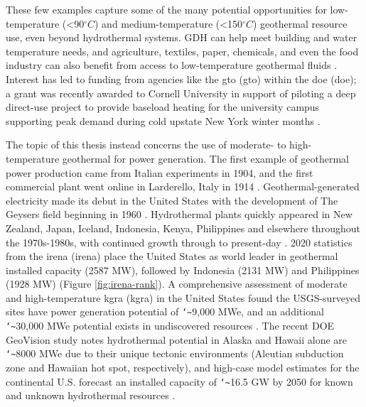 These few examples capture some of the many potential opportunities for low-temperature (<90\(^\circ C\)) and medium-temperature (<150\(^\circ C\)) geothermal resource use, even beyond hydrothermal systems. GDH can help meet building and water temperature needs, and agriculture, textiles, paper, chemicals, and even the food industry can also benefit from access to low-temperature geothermal fluids \citep{doe_low_2021,liu_overview_2015}. Interest has led to funding from agencies like the \acrlong{gto} (\acrshort{gto}) within the \acrlong{doe} (\acrshort{doe}); a grant was recently awarded to Cornell University in support of piloting a deep direct-use project to provide baseload heating for the university campus supporting peak demand during cold upstate New York winter months  \citep{hamm_geothermal_2021,tester_integrating_2015}.

The topic of this thesis instead concerns the use of moderate- to high-temperature geothermal for power generation. The first example of geothermal power production came from Italian experiments in 1904, and the first commercial plant went online in Larderello, Italy in 1914 \citep[~p. 251]{dipippo_geothermal_2012}. Geothermal-generated electricity made its debut in the United States with the development of The Geysers field beginning in 1960 \citep{tester_future_2006}. Hydrothermal plants quickly appeared in New Zealand, Japan, Iceland, Indonesia, Kenya, Philippines and elsewhere throughout the 1970s-1980s, with continued growth through to present-day \citep{lund_characteristics_2007}. 2020 statistics from the \acrlong{irena} (\acrshort{irena}) place the United States as world leader in geothermal installed capacity (2587 MW), followed by Indonesia (2131 MW) and Philippines (1928 MW) \citep{irena_country_2021} (Figure \ref{fig:irena-rank}). A comprehensive assessment of moderate and high-temperature \acrlong{kgra} (\acrshort{kgra}) in the United States found the USGS-surveyed sites have power generation potential of \texttt{\char`\~}9,000 MWe, and an additional \texttt{\char`\~}30,000 MWe potential exists in undiscovered resources \citep{williams_assessment_2008}. The recent DOE GeoVision study notes hydrothermal potential in Alaska and Hawaii alone are \texttt{\char`\~}8000 MWe due to their unique tectonic environments (Aleutian subduction zone and Hawaiian hot spot, respectively), and high-case model estimates for the continental U.S. forecast an installed capacity of \texttt{\char`\~}16.5 GW by 2050 for known and unknown hydrothermal resources \citep{augustine_geovision_2019,hamm_overview_2019}.

